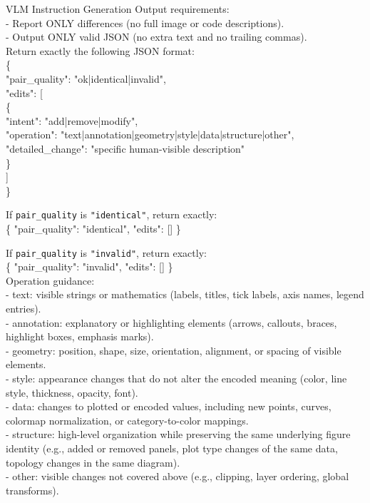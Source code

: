 \begin{PromptBox}{VLM Instruction Generation}
Output requirements: \\
- Report ONLY differences (no full image or code descriptions). \\
- Output ONLY valid JSON (no extra text and no trailing commas). \\

Return exactly the following JSON format: \\
{\ttfamily
\{ \\
\hspace*{1.5em}"pair\_quality": "ok|identical|invalid", \\
\hspace*{1.5em}"edits": [ \\
\hspace*{3em}\{ \\
\hspace*{4.5em}"intent": "add|remove|modify", \\
\hspace*{4.5em}"operation": "text|annotation|geometry|style|data|structure|other", \\
\hspace*{4.5em}"detailed\_change": "specific human-visible description" \\
\hspace*{3em}\} \\
\hspace*{1.5em}] \\
\} \\
}

If \texttt{pair\_quality} is \texttt{"identical"}, return exactly: \\
{\ttfamily
\{ "pair\_quality": "identical", "edits": [] \}
}

If \texttt{pair\_quality} is \texttt{"invalid"}, return exactly: \\
{\ttfamily
\{ "pair\_quality": "invalid", "edits": [] \}
} \\

Operation guidance: \\
- text: visible strings or mathematics (labels, titles, tick labels, axis names, legend entries). \\
- annotation: explanatory or highlighting elements (arrows, callouts, braces, highlight boxes, emphasis marks). \\
- geometry: position, shape, size, orientation, alignment, or spacing of visible elements. \\
- style: appearance changes that do not alter the encoded meaning (color, line style, thickness, opacity, font). \\
- data: changes to plotted or encoded values, including new points, curves, colormap normalization, or category-to-color mappings. \\
- structure: high-level organization while preserving the same underlying figure identity (e.g., added or removed panels, plot type changes of the same data, topology changes in the same diagram). \\
- other: visible changes not covered above (e.g., clipping, layer ordering, global transforms). \\


\end{PromptBox}
